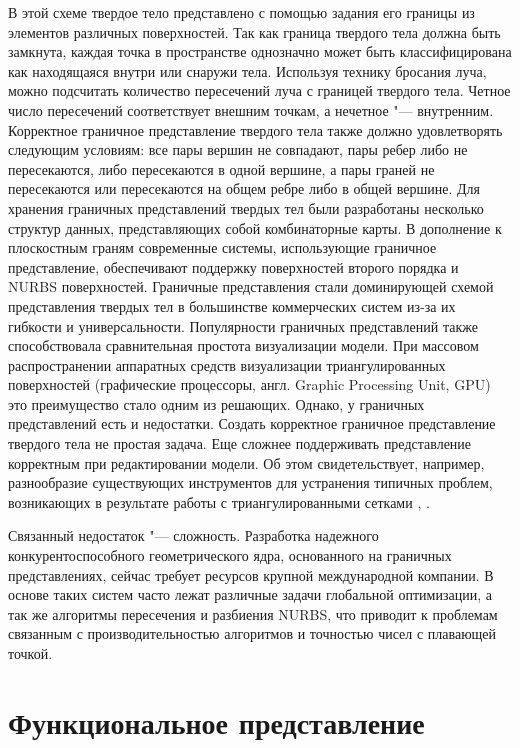 В этой схеме твердое тело представлено с помощью задания его границы из элементов различных поверхностей. Так как граница твердого тела должна быть замкнута, каждая точка в пространстве однозначно может быть классифицирована как находящаяся внутри или снаружи тела. Используя технику бросания луча, можно подсчитать количество пересечений  луча с границей твердого тела. Четное число пересечений соответствует внешним точкам, а нечетное "--- внутренним. Корректное граничное представление твердого тела также должно удовлетворять следующим условиям: все пары вершин не совпадают, пары ребер либо не пересекаются, либо пересекаются в одной вершине, а пары граней не пересекаются или пересекаются на общем ребре либо в общей вершине. Для хранения граничных представлений твердых тел были разработаны несколько структур данных, представляющих собой комбинаторные карты. В дополнение к плоскостным граням современные системы, использующие граничное представление, обеспечивают поддержку поверхностей второго порядка и NURBS поверхностей. Граничные представления стали доминирующей схемой представления твердых тел в большинстве коммерческих систем из-за их гибкости и универсальности. Популярности граничных представлений также способствовала сравнительная простота визуализации модели. При массовом распространении аппаратных средств визуализации триангулированных поверхностей (графические процессоры, англ. Graphic Processing Unit, GPU) это преимущество стало одним из решающих. Однако, у граничных представлений есть и недостатки. Создать корректное граничное представление твердого тела не простая задача. Еще сложнее поддерживать представление корректным при редактировании модели. Об этом свидетельствует, например, разнообразие существующих инструментов для устранения типичных проблем, возникающих в результате работы с триангулированными сетками \cite{LaMarche}, \cite{MeshlabCleaning}.

Связанный недостаток "--- сложность. Разработка надежного конкурентоспособного геометрического ядра, основанного на граничных представлениях, сейчас требует ресурсов крупной международной компании. В основе таких систем часто лежат различные задачи глобальной оптимизации, а так же алгоритмы пересечения и разбиения NURBS, что приводит к проблемам связанным с производительностью алгоритмов и точностью чисел с плавающей точкой.

\section{Функциональное представление} \label{sect_implicit}

